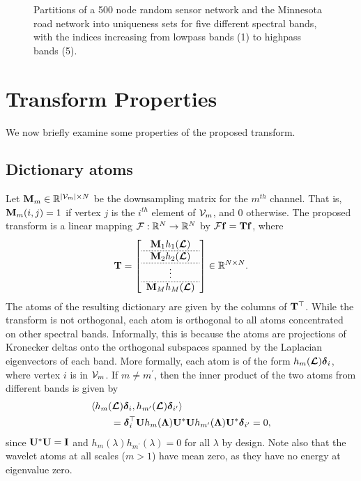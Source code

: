 \documentclass[journal, 10pt]{IEEEtran}
\begin{document}
\begin{figure}[tb]
\begin{minipage}[m]{0.46\linewidth}
\end{minipage}
\caption{Partitions of a 500 node random sensor network and the Minnesota road network \cite{gleich} into uniqueness sets for five different spectral bands, with the indices increasing from lowpass bands (1) to highpass bands (5).} \label{Fig:part_examples}
\end{figure} 


\section{Transform Properties}
We now briefly examine some properties of the proposed transform. 
\subsection{Dictionary atoms}
Let ${\bf M}_m \in \R^{|{\cal V}_m| \times N}$ be the downsampling matrix for the $m^{th}$ channel. That is, ${\bf M}_m(i,j)=1$ if vertex $j$ is the $i^{th}$ element of ${\cal V}_m$, and 0 otherwise. The proposed transform is a linear mapping ${\cal F}: \R^N \rightarrow \R^N$ by ${\cal F}{\bf f} = {\bf Tf}$, where 
\begin{align*}
{\bf T}=\left[
\begin{array}{c}
{\bf M}_1 h_1(\L) \\  \hdashline[.05cm/.05cm]
{\bf M}_2 h_2(\L) \\  \hdashline[.05cm/.05cm]
\vdots \\  \hdashline[.05cm/.05cm]
{\bf M}_M h_M(\L)
\end{array}
\right] \in \R^{N \times N}.
\end{align*}
The atoms of the resulting dictionary are given by the columns of ${\bf T}^{\top}$. While the transform is not orthogonal, each atom is orthogonal to all atoms concentrated on other spectral bands. Informally, this is because the atoms are projections of Kronecker deltas onto the orthogonal subspaces spanned by the Laplacian eigenvectors of each band. More formally, each atom is of the form $h_m(\boldsymbol{\mathcal{L}}){\boldsymbol \delta}_i$, where vertex $i$ is in ${\cal V}_m$. If $m \neq m^{\prime}$, then the inner product of the two atoms from different bands is given by
\begin{align} \label{Eq:ortho_bands}
&\langle h_m(\L){\boldsymbol \delta}_i , h_{m^{\prime}}(\L){\boldsymbol \delta}_{i^{\prime}} \rangle \nonumber \\
&~~~~~~= {\boldsymbol \delta}_i^{\top} {\bf U} h_m({\boldsymbol \Lambda}) {\bf U}^* {\bf U} h_{m^{\prime}}({\boldsymbol \Lambda}) {\bf U}^* {\boldsymbol \delta}_{i^{\prime}}= 0,
\end{align}
since ${\bf U}^* {\bf U}={\bf I}$ and $h_m(\lambda)h_{m^{\prime}}(\lambda)=0$ for all $\lambda$ by design.
Note also that the wavelet atoms at all scales ($m>1$) have mean zero, as they have no energy at eigenvalue zero.
\end{document}
